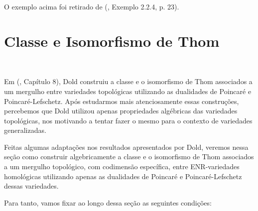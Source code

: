 \documentclass[12pt,oneside]{book} %
\begin{document}
\par O exemplo acima foi retirado de (\cite{denise}, Exemplo 2.2.4, p. 23).






\section{Classe e Isomorfismo de Thom}\label{sec_thom_gen}

\

\par Em (\cite{dold}, Capítulo 8), Dold construiu a classe e o isomorfismo de Thom associados a um mergulho entre variedades topológicas utilizando as dualidades de Poincaré e Poincaré-Lefschetz. Após estudarmos mais atenciosamente essas construções, percebemos que Dold utilizou apenas propriedades algébricas das variedades topológicas, nos motivando a tentar fazer o mesmo para o contexto de variedades generalizadas.

\par Feitas algumas adaptações nos resultados apresentados por Dold, veremos nessa seção como construir algebricamente a classe e o isomorfismo de Thom associados a um mergulho topológico, com codimensão específica, entre ENR-variedades homológicas utilizando apenas as dualidades de Poincaré e Poincaré-Lefschetz dessas variedades.

\par Para tanto, vamos fixar ao longo dessa seção as seguintes condições:
\end{document}
